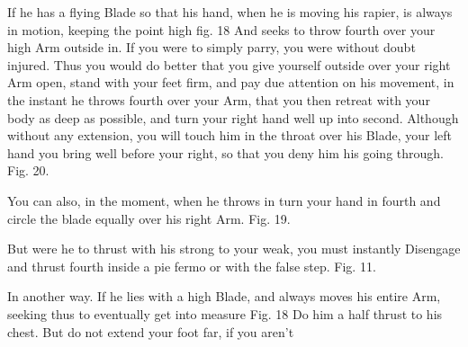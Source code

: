 \exercise{}


If he has a flying Blade so that his hand, when he is moving his rapier, is always in motion, keeping the point high fig. 18 And seeks to throw fourth over your high Arm outside in. If you were to simply parry, you were without doubt injured. Thus you would do better that you give yourself outside over your right Arm open, stand with your feet firm, and pay due attention on his movement, in the instant he throws fourth over your Arm, that you then retreat with your body as deep as possible, and turn your right hand well up into second. Although without any extension, you will touch him in the throat over his Blade, your left hand you bring well before your right, so that you deny him his going through. Fig. 20.

\exercise{}


You can also, in the moment, when he throws in turn your hand in
fourth and circle the blade equally over his right Arm. Fig. 19.

\exercise{}


But were he to thrust with his strong to your weak, you must instantly
Disengage and thrust fourth inside a pie fermo or with the false
step. Fig. 11.

\exercise{}


In another way. If he lies with a high Blade, and always moves his
entire Arm, seeking thus to eventually get into measure Fig. 18 Do him
a half thrust to his chest. But do not extend your foot far, if you
aren't
